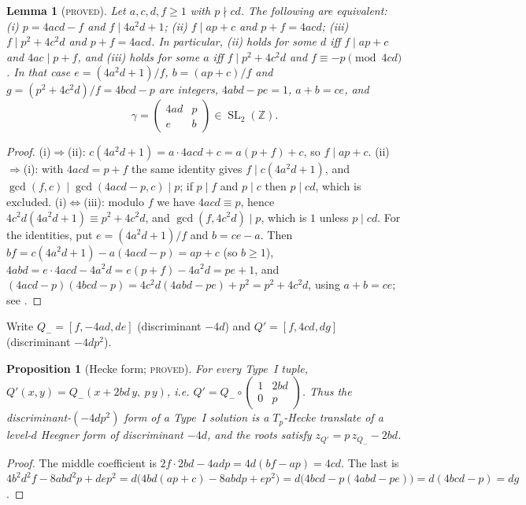 \documentclass[10pt,reqno]{amsart}
\newtheorem{lemma}[theorem]{Lemma}
\newtheorem{proposition}[theorem]{Proposition}
\theoremstyle{definition}
\numberwithin{equation}{section}
\newcommand{\Z}{\mathbb Z}
\DeclareMathOperator{\SL}{SL}
\newcommand{\status}[1]{\textup{\textsc{#1}}}
\begin{document}
\begin{lemma}[\status{proved}]\label{lem:typeI}
Let $a,c,d,f\ge1$ with $p\nmid cd$. The following are equivalent:
\textup{(i)} $p=4acd-f$ and $f\mid 4a^2d+1$;
\textup{(ii)} $f\mid ap+c$ and $p+f=4acd$;
\textup{(iii)} $f\mid p^2+4c^2d$ and $p+f=4acd$.
In particular, (ii) holds for some $d$ iff $f\mid ap+c$ and $4ac\mid p+f$, and
(iii) holds for some $a$ iff $f\mid p^2+4c^2d$ and $f\equiv-p\pmod{4cd}$.
In that case $e=(4a^2d+1)/f$, $b=(ap+c)/f$ and
$g=(p^2+4c^2d)/f=4bcd-p$ are integers, $4abd-pe=1$, $a+b=ce$, and
\[\gamma=\begin{pmatrix}4ad&p\\ e&b\end{pmatrix}\in\SL_2(\Z).\]
\end{lemma}
\begin{proof}
(i)$\Rightarrow$(ii): $c(4a^2d+1)=a\cdot4acd+c=a(p+f)+c$, so
$f\mid ap+c$. (ii)$\Rightarrow$(i): with $4acd=p+f$ the same identity gives
$f\mid c(4a^2d+1)$, and $\gcd(f,c)\mid\gcd(4acd-p,c)\mid p$; if $p\mid f$
and $p\mid c$ then $p\mid cd$, which is excluded. (i)$\Leftrightarrow$(iii):
modulo $f$ we have $4acd\equiv p$, hence
$4c^2d(4a^2d+1)\equiv p^2+4c^2d$, and $\gcd(f,4c^2d)\mid p$, which is $1$
unless $p\mid cd$. For the identities, put $e=(4a^2d+1)/f$ and $b=ce-a$.
Then $bf=c(4a^2d+1)-a(4acd-p)=ap+c$ (so $b\ge1$),
$4abd=e\cdot4acd-4a^2d=e(p+f)-4a^2d=pe+1$, and
$(4acd-p)(4bcd-p)=4c^2d(4abd-pe)+p^2=p^2+4c^2d$, using $a+b=ce$; see
\cite[(2.8)--(2.9)]{ET}.
\end{proof}

Write $Q_-=[f,-4ad,de]$ (discriminant $-4d$) and $Q'=[f,4cd,dg]$
(discriminant $-4dp^2$).

\begin{proposition}[Hecke form; \status{proved}]\label{prop:hecke}
For every Type~I tuple,
$Q'(x,y)=Q_-(x+2bd\,y,\ p\,y)$, i.e.
$Q'=Q_-\circ\left(\begin{smallmatrix}1&2bd\\0&p\end{smallmatrix}\right)$.
Thus the discriminant-$(-4dp^2)$ form of a Type~I solution is a
$T_p$-Hecke translate of a level-$d$ Heegner form of discriminant $-4d$,
and the roots satisfy $z_{Q'}=p\,z_{Q_-}-2bd$.
\end{proposition}
\begin{proof}
The middle coefficient is $2f\cdot2bd-4adp=4d(bf-ap)=4cd$. The last is
$4b^2d^2f-8abd^2p+dep^2=d\bigl(4bd(ap+c)-8abdp+ep^2\bigr)
=d\bigl(4bcd-p(4abd-pe)\bigr)=d(4bcd-p)=dg$.
\end{proof}
\end{document}
